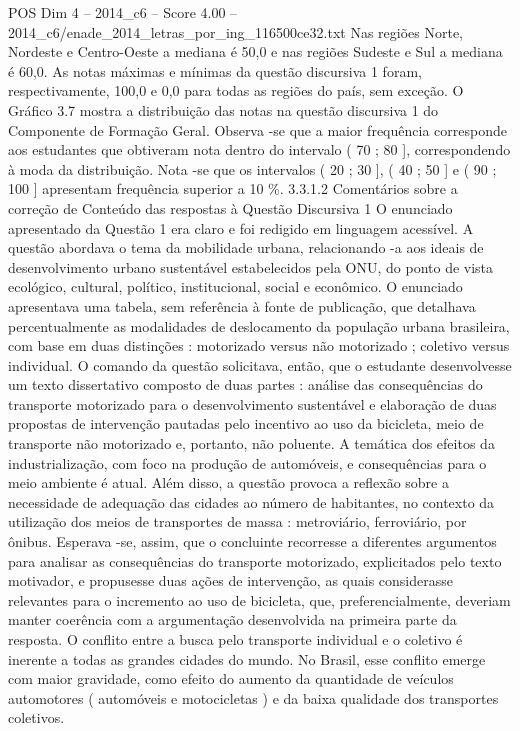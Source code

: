 \begin{textsample}{POS Dim 4 – 2014\_c6 – Score 4.00 – 2014\_c6/enade\_2014\_letras\_por\_ing\_116500ce32.txt}
Nas regiões Norte, Nordeste e Centro-Oeste a mediana é 50,0 e nas regiões Sudeste e Sul a mediana é 60,0.
As notas máximas e mínimas da questão discursiva 1 foram, respectivamente, 100,0 e 0,0 para todas as regiões do país, sem exceção.
O Gráfico 3.7 mostra a distribuição das notas na questão discursiva 1 do Componente de Formação Geral.
Observa -se que a maior frequência corresponde aos estudantes que obtiveram nota dentro do intervalo ( 70 ; 80 ], correspondendo à moda da distribuição.
Nota -se que os intervalos ( 20 ; 30 ], ( 40 ; 50 ] e ( 90 ; 100 ] apresentam frequência superior a 10 \%. 3.3.1.2 Comentários sobre a correção de Conteúdo das respostas à Questão Discursiva 1 O enunciado apresentado da Questão 1 era claro e foi redigido em linguagem acessível.
A questão abordava o tema da mobilidade urbana, relacionando -a aos ideais de desenvolvimento urbano sustentável estabelecidos pela ONU, do ponto de vista ecológico, cultural, político, institucional, social e econômico.
O enunciado apresentava uma tabela, sem referência à fonte de publicação, que detalhava percentualmente as modalidades de deslocamento da população urbana brasileira, com base em duas distinções : motorizado versus não motorizado ; coletivo versus individual.
O comando da questão solicitava, então, que o estudante desenvolvesse um texto dissertativo composto de duas partes : análise das consequências do transporte motorizado para o desenvolvimento sustentável e elaboração de duas propostas de intervenção pautadas pelo incentivo ao uso da bicicleta, meio de transporte não motorizado e, portanto, não poluente.
A temática dos efeitos da industrialização, com foco na produção de automóveis, e consequências para o meio ambiente é atual.
Além disso, a questão provoca a reflexão sobre a necessidade de adequação das cidades ao número de habitantes, no contexto da utilização dos meios de transportes de massa : metroviário, ferroviário, por ônibus.
Esperava -se, assim, que o concluinte recorresse a diferentes argumentos para analisar as consequências do transporte motorizado, explicitados pelo texto motivador, e propusesse duas ações de intervenção, as quais considerasse relevantes para o incremento ao uso de bicicleta, que, preferencialmente, deveriam manter coerência com a argumentação desenvolvida na primeira parte da resposta.
O conflito entre a busca pelo transporte individual e o coletivo é inerente a todas as grandes cidades do mundo.
No Brasil, esse conflito emerge com maior gravidade, como efeito do aumento da quantidade de veículos automotores ( automóveis e motocicletas ) e da baixa qualidade dos transportes coletivos.

\end{textsample}

